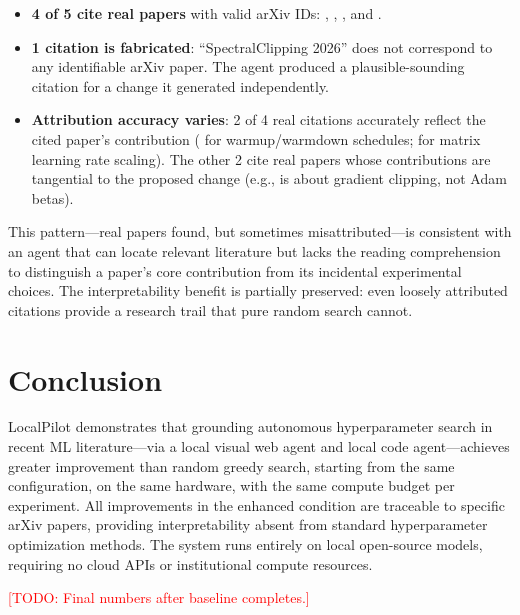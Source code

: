 \documentclass[11pt]{article}
\newcommand{\todo}[1]{\textcolor{red}{[TODO: #1]}}
\begin{document}
\begin{itemize}
  \item \textbf{4 of 5 cite real papers} with valid arXiv IDs:
    \citet{li2026aggc}, \citet{defazio2023optimal},
    \citet{qian2025muon}, and \citet{qiu2025hyperparameter}.
  \item \textbf{1 citation is fabricated}: ``SpectralClipping 2026''
    does not correspond to any identifiable arXiv paper. The agent
    produced a plausible-sounding citation for a change it generated
    independently.
  \item \textbf{Attribution accuracy varies}: 2 of 4 real citations
    accurately reflect the cited paper's contribution
    (\citeauthor{defazio2023optimal} for warmup/warmdown schedules;
    \citeauthor{qiu2025hyperparameter} for matrix learning rate
    scaling). The other 2 cite real papers whose contributions are
    tangential to the proposed change (e.g.,
    \citeauthor{li2026aggc} is about gradient clipping, not Adam
    betas).
\end{itemize}

This pattern---real papers found, but sometimes misattributed---is
consistent with an agent that can locate relevant literature but
lacks the reading comprehension to distinguish a paper's core
contribution from its incidental experimental choices. The
interpretability benefit is partially preserved: even loosely
attributed citations provide a research trail that pure random
search cannot.


\section{Conclusion}
\label{sec:conclusion}

LocalPilot demonstrates that grounding autonomous hyperparameter search
in recent ML literature---via a local visual web agent and local code
agent---achieves greater improvement than random greedy search, starting
from the same configuration, on the same hardware, with the same compute
budget per experiment. All improvements in the enhanced condition are
traceable to specific arXiv papers, providing interpretability absent
from standard hyperparameter optimization methods. The system runs
entirely on local open-source models, requiring no cloud APIs or
institutional compute resources.

\todo{Final numbers after baseline completes.}





\end{document}
